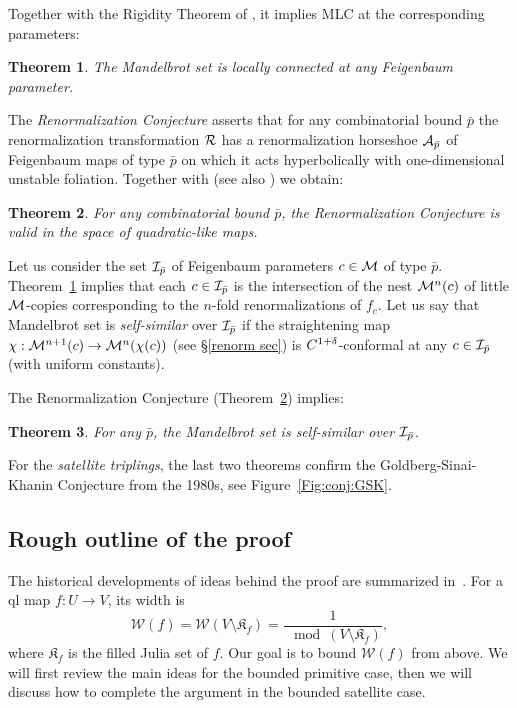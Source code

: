 \documentclass{amsart}
\newcommand{\filled}{{\mathfrak K }}
\newcommand{\1}{{\mathbb 1 }}
\newcommand{\Width}{{\mathcal W}}
\newtheorem{mthm}{Theorem}
\begin{document}
Together with the Rigidity Theorem of \cite{puzzle}, it implies MLC at the corresponding parameters:
 
\begin{mthm}
\label{mainthm:B}
The Mandelbrot set is locally connected at any Feigenbaum parameter. 
\end{mthm}

The {\em Renormalization Conjecture} asserts that for any combinatorial bound  $\bar p$ the renormalization transformation ${\mathcal R}$
has a renormalization horseshoe ${\mathcal A}_{\bar p}$ of Feigenbaum maps of type  $\bar p$ on which it acts hyperbolically
with one-dimensional unstable foliation. Together with \cite{L:universality} (see also \cite{S,McM2,AL}) we obtain:

\begin{mthm}
\label{mainthm:C}
For any combinatorial bound $\bar p$,
 the Renormalization Conjecture is valid in the space of quadratic-like maps. 
\end{mthm}

Let us consider the set ${\mathcal I}_{\bar p}$  of Feigenbaum parameters $c\in {\mathcal{M}}$ of type $\bar p$.
Theorem~\ref{mainthm:B} implies that each $c\in {\mathcal I}_{\bar p}$ is the intersection of the nest ${\mathcal M}^n(c)$ of little
${\mathcal M}$-copies corresponding to the  $n$-fold renormalizations of $f_c$.  
Let us say that Mandelbrot set is \emph{self-similar} over ${\mathcal I}_{\bar p}$ if
the straightening map $\chi:{\mathcal M}^{n+1} (c) \rightarrow {\mathcal M}^n(\chi(c)) $  (see \S \ref{renorm sec})
is $C^{1+{\delta}}$-conformal at any  $c\in {\mathcal I}_{\bar p}$
(with uniform constants). 


The Renormalization Conjecture (Theorem~\ref{mainthm:C}) implies: 

\newtheorem*{Theorem D}{Theorem D}
\begin{mthm}
  For any $\bar p$, the Mandelbrot set is self-similar over ${\mathcal I}_{\bar p}$.
\end{mthm}


For the {\em satellite triplings}, the last two  theorems confirm the
Goldberg-Sinai-Khanin Conjecture \cite{GSK} from the 1980s, see Figure~\ref{Fig:conj:GSK}.

\subsection{Rough outline of the proof} The historical developments of ideas behind the proof are summarized in~\cite{L21}. 
 For a ql map $f\colon U\to V$, its width is
\[\Width(f) = \Width(V\setminus \filled_f)=\frac{1}{\mod (V\setminus \filled_f)} ,\]
 where $\filled_f$ is the filled Julia set of $f$. Our goal is to bound $\Width(f)$ from above. We will first review the main ideas for the bounded primitive case, then we will discuss how to complete the argument in the bounded satellite case.
\end{document}
